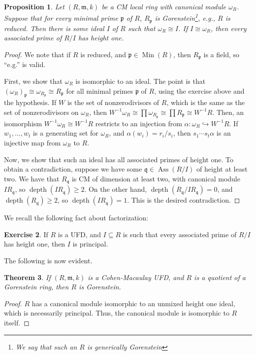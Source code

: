 \documentclass[11pt]{book}
\newtheorem{theorem}{Theorem}[chapter]
\newtheorem{proposition}[theorem]{Proposition}
\numberwithin{equation}{section}
\numberwithin{theorem}{chapter}
\theoremstyle{definition}
\newtheorem{exercise}[theorem]{Exercise}
\newtheorem*{basic properties}{Basic Properties}
\newtheorem*{Important Remark}{Important Remark}
\theoremstyle{remark}
\newcommand{\m}{\mathfrak{m}}
\newcommand{\p}{\mathfrak{p}}
\newcommand{\q}{\mathfrak{q}}
\newcommand{\Ass}{\operatorname{Ass}}
\newcommand{\Min}{\operatorname{Min}}
\newcommand{\depth}{\operatorname{depth}}
\begin{document}
\begin{proposition}
Let $(R,\m,k)$ be a CM local ring with canonical module $\omega_R$. Suppose that for every minimal prime $\p$ of $R$, $R_\p$ is Gorenstein\footnote{We say that such an $R$ is \emph{generically Gorenstein}}, e.g., $R$ is reduced. Then there is some ideal $I$ of $R$ such that $\omega_R\cong I$. If $I\cong \omega_R$, then every associated prime of $R/I$ has height one. 
\end{proposition}
\begin{proof}
We note that if $R$ is reduced, and $\p\in \Min(R)$, then $R_\p$ is a field, so ``e.g.'' is valid.

First, we show that $\omega_R$ is isomorphic to an ideal. The point is that $(\omega_R)_{\p}\cong \omega_{R_\p} \cong R_\p$ for all minimal primes $\p$ of $R$, using the exercise above and the hypothesis. If $W$ is the set of nonzerodivisors of $R$, which is the same as the set of nonzerodivisors on $\omega_R$, then $W^{-1} \omega_R \cong \prod \omega_{R_\p} \cong \prod R_\p \cong W^{-1}R$. Then, an isomorphism $W^{-1}\omega_R \cong W^{-1} R$ restricts to an injection from $\alpha: \omega_R \hookrightarrow W^{-1}R$. If $w_1,\dots,w_t$ is a generating set for $\omega_R$, and $\alpha(w_i)=r_i/s_i$, then $s_1\cdots s_t \alpha$ is an injective map from $\omega_R$ to $R$.

Now, we show that such an ideal has all associated primes of height one. To obtain a contradiction, suppose we have some $\q\in \Ass(R/I)$ of height at least two. We have that $R_\q$ is CM of dimension at least two, with canonical module $I R_\q$, so $\depth(I R_{\q})\geq 2$. On the other hand, $\depth(R_{\q}/ I R_{\q})=0$, and $\depth(R_{\q})\geq 2$, so $\depth(I R_\q)=1$. This is the desired contradiction.
\end{proof}

We recall the following fact about factorization:

\begin{exercise} If $R$ is a UFD, and $I\subseteq R$ is such that every associated prime of $R/I$ has height one, then $I$ is principal.
\end{exercise}

The following is now evident.

\begin{theorem}
If $(R,\m,k)$ is a Cohen-Macaulay UFD, and $R$ is a quotient of a Gorenstein ring, then $R$ is Gorenstein.
\end{theorem}
\begin{proof}
$R$ has a canonical module isomorphic to an unmixed height one ideal, which is necessarily principal. Thus, the canonical module is isomorphic to $R$ itself.
\end{proof}
\end{document}
